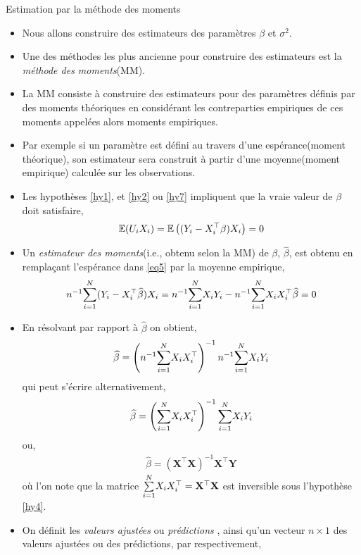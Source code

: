 \begin{frame}[allowframebreaks]{Estimation par la méthode des moments}
\begin{itemize}
\item Nous allons construire des estimateurs des paramètres $\beta$ et $\sigma^2$. 
\item Une des méthodes les plus ancienne pour construire des estimateurs est la \emph{méthode des moments}(MM). \item La MM consiste à construire des estimateurs pour des paramètres définis par des moments théoriques en considérant les contreparties empiriques de ces moments appelées alors moments empiriques. 
\item Par exemple si un paramètre est défini au travers d'une espérance(moment théorique), son  estimateur sera construit à partir d'une moyenne(moment empirique) calculée sur les observations.
\item Les hypothèses \ref{hy1}, et \ref{hy2} ou \ref{hy7} impliquent que la vraie valeur de $\beta$ doit satisfaire,
\begin{align}
\mathbb{E}(U_iX_i) = \mathbb{E}\left((Y_i-X_i^\top\beta)X_i\right) = 0
\label{eq5}
\end{align}
 \item Un \emph{estimateur des moments}(i.e., obtenu selon la MM) de $\beta$, $\widehat{\beta}$,  est obtenu en remplaçant l'espérance dans \eqref{eq5} par la moyenne empirique,
\begin{align}
n^{-1}\underset{i=1}{\overset{N}{\sum}}(Y_i - X_i^\top\widehat{\beta})X_i = n^{-1}\underset{i=1}{\overset{N}{\sum}} X_iY_i - n^{-1}\underset{i=1}{\overset{N}{\sum}} X_iX_i^\top\widehat{\beta} = 0
\label{eq6}
\end{align}
\item En résolvant par rapport à $\widehat{\beta}$ on obtient,
\begin{align}
\widehat{\beta} = \left(n^{-1}\underset{i=1}{\overset{N}{\sum}} X_iX_i^\top\right)^{-1}n^{-1}\underset{i=1}{\overset{N}{\sum}} X_iY_i
\label{eq7}
\end{align}
qui peut s'écrire alternativement,
\begin{align}
\widehat{\beta} = \left(\underset{i=1}{\overset{N}{\sum}} X_iX_i^\top\right)^{-1}\underset{i=1}{\overset{N}{\sum}} X_iY_i
\label{eq8}
\end{align}
ou,
\begin{align}
\widehat{\beta} = \left(\mathbf{X}^\top\mathbf{X}\right)^{-1}\mathbf{X}^\top\mathbf{Y}
\label{eq9}
\end{align}
où l'on note que la matrice $\underset{i=1}{\overset{N}{\sum}} X_iX_i^\top = \mathbf{X}^\top\mathbf{X}$ est inversible sous l'hypothèse \ref{hy4}.
\item On définit les \emph{valeurs ajustées} ou \emph{prédictions} , ainsi qu'un vecteur $n\times 1$ des valeurs ajustées ou des prédictions, par respectivement,

\end{itemize}
\end{frame}

